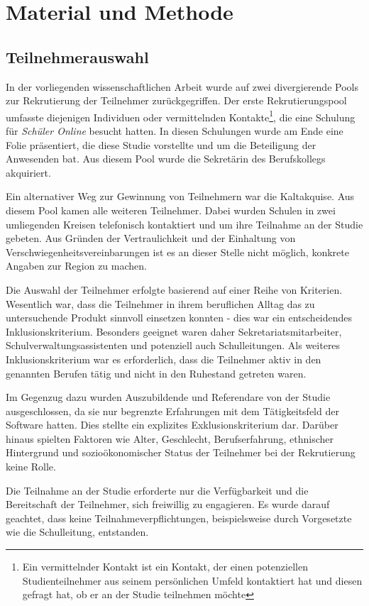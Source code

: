 \section{Material und Methode}
\subsection{Teilnehmerauswahl}

In der vorliegenden wissenschaftlichen Arbeit wurde auf zwei divergierende Pools zur Rekrutierung der Teilnehmer zurückgegriffen. Der erste Rekrutierungspool umfasste diejenigen Individuen oder vermittelnden Kontakte\footnote{Ein vermittelnder Kontakt ist ein Kontakt, der einen potenziellen Studienteilnehmer aus seinem persönlichen Umfeld kontaktiert hat und diesen gefragt hat, ob er an der Studie teilnehmen möchte}, die eine Schulung für \textit{Schüler Online} besucht hatten. In diesen Schulungen wurde am Ende eine Folie präsentiert, die diese Studie vorstellte und um die Beteiligung der Anwesenden bat. Aus diesem Pool wurde die Sekretärin des Berufskollegs akquiriert.

Ein alternativer Weg zur Gewinnung von Teilnehmern war die Kaltakquise. Aus diesem Pool kamen alle weiteren Teilnehmer. Dabei wurden Schulen in zwei umliegenden Kreisen telefonisch kontaktiert und um ihre Teilnahme an der Studie gebeten. Aus Gründen der Vertraulichkeit und der Einhaltung von Verschwiegenheitsvereinbarungen ist es an dieser Stelle nicht möglich, konkrete Angaben zur Region zu machen.

Die Auswahl der Teilnehmer erfolgte basierend auf einer Reihe von Kriterien. Wesentlich war, dass die Teilnehmer in ihrem beruflichen Alltag das zu untersuchende Produkt sinnvoll einsetzen konnten - dies war ein entscheidendes Inklusionskriterium. Besonders geeignet waren daher Sekretariatsmitarbeiter, Schulverwaltungsassistenten und potenziell auch Schulleitungen. Als weiteres Inklusionskriterium war es erforderlich, dass die Teilnehmer aktiv in den genannten Berufen tätig und nicht in den Ruhestand getreten waren.

Im Gegenzug dazu wurden Auszubildende und Referendare von der Studie ausgeschlossen, da sie nur begrenzte Erfahrungen mit dem Tätigkeitsfeld der Software hatten. Dies stellte ein explizites Exklusionskriterium dar. Darüber hinaus spielten Faktoren wie Alter, Geschlecht, Berufserfahrung, ethnischer Hintergrund und sozioökonomischer Status der Teilnehmer bei der Rekrutierung keine Rolle.

Die Teilnahme an der Studie erforderte nur die Verfügbarkeit und die Bereitschaft der Teilnehmer, sich freiwillig zu engagieren. Es wurde darauf geachtet, dass keine Teilnahmeverpflichtungen, beispielsweise durch Vorgesetzte wie die Schulleitung, entstanden.

